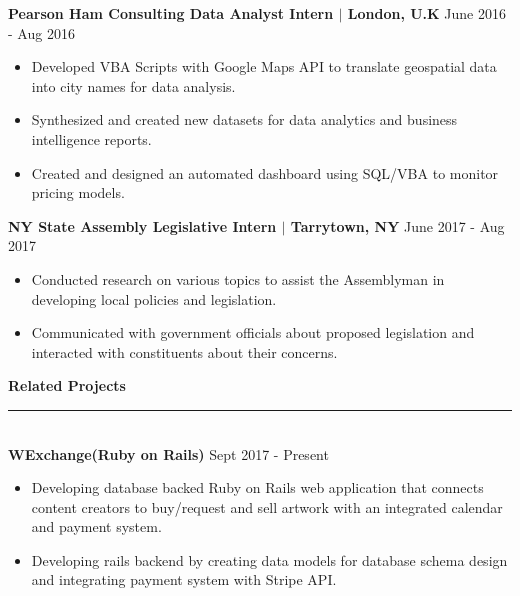 \documentclass{article}
\newcommand{\HRule}{\rule{\linewidth}{0.4mm}}
\begin{document}
\noindent
\textbf{Pearson Ham Consulting Data Analyst Intern $|$ London, U.K}
\hfill June 2016 - Aug 2016 

\begin{itemize}[leftmargin=*]
\vspace{-2.5mm}
\item Developed VBA Scripts with Google Maps API to translate geospatial data into city names for data analysis.
\vspace{-2.0mm}
\item Synthesized and created new datasets for data analytics and business intelligence reports.
\vspace{-2.5mm}
\item Created and designed an automated dashboard using SQL/VBA to monitor pricing models.
\end{itemize}
\vspace{-2.0mm}

\noindent
\textbf{NY State Assembly Legislative Intern $|$ Tarrytown, NY}
\hfill June 2017 - Aug 2017

\begin{itemize}[leftmargin=*]
\vspace{-2.5mm}
\item Conducted research on various topics to assist the Assemblyman in developing local policies and legislation.
\vspace{-2.5mm}
\item Communicated with government officials about proposed legislation and interacted with constituents about their concerns.
\end{itemize}



\noindent
\textbf{{\Large Related Projects}}\\[-2mm]
\HRule\\
\noindent
\textbf{WExchange(Ruby on Rails)}
\hfill Sept 2017 - Present 
\begin{itemize}[leftmargin=*]
\vspace{-2.5mm}
\item Developing database backed Ruby on Rails web application that connects content creators to buy/request and sell artwork with an integrated calendar and payment system.
\vspace{-2.5mm}
\item Developing rails backend by creating data models for database schema design and integrating payment system with Stripe API. 
\end{itemize}
\vspace{-2.0mm}
\end{document}
